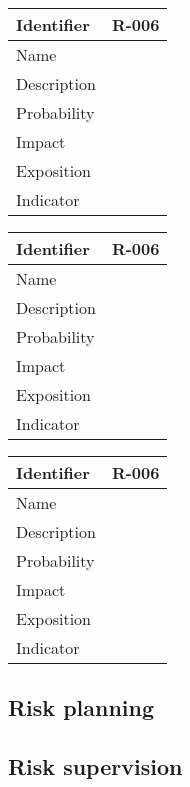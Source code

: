 \begin{table}[H]
	\begin{tabularx}{\textwidth}{|l|X|}
		\hline
		\rowcolor{gray!30}
		Identifier & \textbf{R-006} \\ \hline
		Name & \\ \hline
		Description & \\ \hline
		Probability & \\ \hline
		Impact &  \\ \hline
		Exposition &  \\ \hline
		Indicator & \\ \hline
	\end{tabularx}
\end{table}
\begin{table}[H]
	\begin{tabularx}{\textwidth}{|l|X|}
		\hline
		\rowcolor{gray!30}
		Identifier & \textbf{R-006} \\ \hline
		Name & \\ \hline
		Description & \\ \hline
		Probability & \\ \hline
		Impact &  \\ \hline
		Exposition &  \\ \hline
		Indicator & \\ \hline
	\end{tabularx}
\end{table}
\begin{table}[H]
	\begin{tabularx}{\textwidth}{|l|X|}
		\hline
		\rowcolor{gray!30}
		Identifier & \textbf{R-006} \\ \hline
		Name & \\ \hline
		Description & \\ \hline
		Probability & \\ \hline
		Impact &  \\ \hline
		Exposition &  \\ \hline
		Indicator & \\ \hline
	\end{tabularx}
\end{table}


\subsection{Risk planning}


\subsection{Risk supervision}
